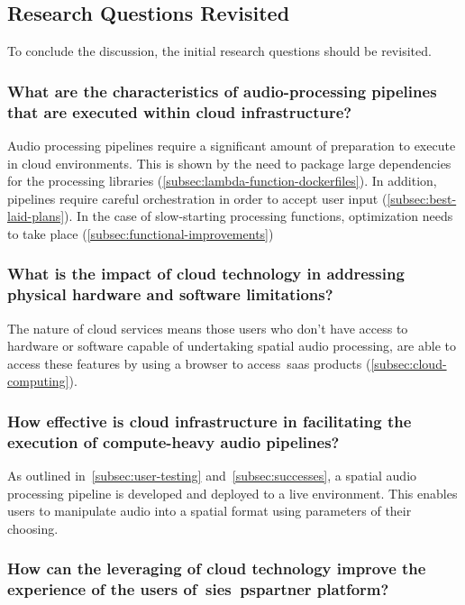 \subsection{Research Questions Revisited}\label{subsec:research-questions2}

To conclude the discussion, the initial research questions should be revisited.

\subsubsection{What are the characteristics of audio-processing pipelines that are executed within cloud infrastructure?}

Audio processing pipelines require a significant amount of preparation to execute in cloud environments.
This is shown by the need
to package large dependencies for the processing libraries (\ref{subsec:lambda-function-dockerfiles}).
In addition, pipelines require careful orchestration in order to accept user input (\ref{subsec:best-laid-plans}).
In the case of slow-starting processing functions, optimization needs to take place (\ref{subsec:functional-improvements})

\subsubsection{What is the impact of cloud technology in addressing physical hardware and software limitations?}

The nature of cloud services means those users
who don't have access to hardware or software capable of undertaking spatial audio processing,
are able to access these features by using a browser to access~\gls{saas} products (\ref{subsec:cloud-computing}).

\subsubsection{How effective is cloud infrastructure in facilitating the execution of compute-heavy audio pipelines?}

As outlined in~\ref{subsec:user-testing} and~\ref{subsec:successes},
a spatial audio processing pipeline is developed and deployed to a live environment.
This enables users to manipulate audio into a spatial format using parameters of their choosing.

\subsubsection{How can the leveraging of cloud technology improve the experience of the users of~\glspl{sie}~\gls{pspartner} platform?}

